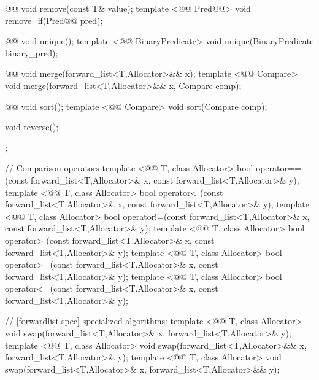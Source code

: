 \documentclass[american,twoside]{book}
\begin{document}
\begin{codeblock}
{{    @@ void remove(const T& value); 
    template <@@ Pred@@> void remove_if(Pred@@ pred); 

    @@ void unique(); 
    template <@@ BinaryPredicate>
      void unique(BinaryPredicate binary_pred); 

    @@ void merge(forward_list<T,Allocator>&& x); 
    template <@@ Compare> 
      void merge(forward_list<T,Allocator>&& x, Compare comp);

    @@ void sort(); 
    template <@@ Compare> void sort(Compare comp); 

    void reverse(); 
  }; 

  // Comparison operators
  template <@@ T, class Allocator> 
    bool operator==(const forward_list<T,Allocator>& x, const forward_list<T,Allocator>& y); 
  template <@@ T, class Allocator> 
    bool operator< (const forward_list<T,Allocator>& x, const forward_list<T,Allocator>& y); 
  template <@@ T, class Allocator> 
    bool operator!=(const forward_list<T,Allocator>& x, const forward_list<T,Allocator>& y); 
  template <@@ T, class Allocator> 
    bool operator> (const forward_list<T,Allocator>& x, const forward_list<T,Allocator>& y); 
  template <@@ T, class Allocator> 
    bool operator>=(const forward_list<T,Allocator>& x, const forward_list<T,Allocator>& y); 
  template <@@ T, class Allocator> 
    bool operator<=(const forward_list<T,Allocator>& x, const forward_list<T,Allocator>& y); 

  // \ref{forwardlist.spec} specialized algorithms: 
  template <@@ T, class Allocator> 
    void swap(forward_list<T,Allocator>& x, forward_list<T,Allocator>& y);
  template <@@ T, class Allocator> 
    void swap(forward_list<T,Allocator>&& x, forward_list<T,Allocator>& y);
  template <@@ T, class Allocator> 
    void swap(forward_list<T,Allocator>& x, forward_list<T,Allocator>&& y); 
}
\end{codeblock}
\end{document}
